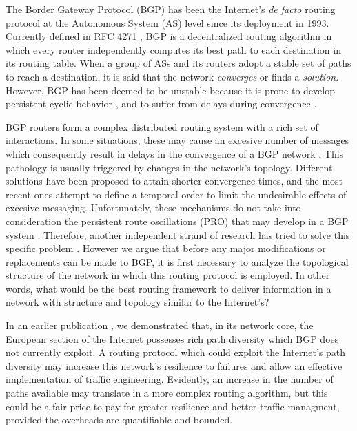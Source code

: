 \documentclass[5p,twocolumn]{elsarticle}
\begin{document}
The Border Gateway Protocol (BGP) has been the Internet's \emph{de facto} routing protocol at the Autonomous System (AS) level since its deployment in 1993. Currently defined in RFC 4271 \cite{Rekhter2006}, BGP is a decentralized routing algorithm in which every router independently computes its best path to each destination in its routing table. When a group of ASs and its routers adopt a stable set of paths to reach a destination, it is said that the network \emph{converges} or finds a \emph{solution}. However, BGP has been deemed to be unstable because it is prone to develop persistent cyclic behavior \cite{Varadhan1996}, and to suffer from delays during convergence \cite{Labovitz2000, Mao2002}.

BGP routers form a complex distributed routing system with a rich set of interactions. In some situations, these may cause an excesive number of messages which consequently result in delays in the convergence of a BGP network \cite{Labovitz1999, Labovitz2000, Mao2002}. This pathology is usually triggered by changes in the network's topology. Different solutions have been proposed to attain shorter convergence times, and the most recent ones \cite{Chandrashekar2005, Pei2005} attempt to define a temporal order to limit the undesirable effects of excesive messaging. Unfortunately, these mechanisms do not take into consideration the persistent route oscillations (PRO) that may develop in a BGP system \cite{Varadhan1996}. Therefore, another independent strand of research has tried to solve this specific problem \cite{Griffin1999, Griffin2002, Gao2000a, Cobb2004, Ee2007}. However we argue that before any major modifications or replacements can be made to BGP, it is first necessary to analyze the topological structure of the network in which this routing protocol is employed. In other words, what would be the best routing framework to deliver information in a network with structure and topology similar to the Internet's?

In an earlier publication \cite{Arjona-Villicana2010}, we demonstrated that, in its network core, the European section of the Internet possesses rich path diversity which BGP does not currently exploit. A routing protocol which could exploit the Internet's path diversity may increase this network's resilience to failures and allow an effective implementation of traffic engineering. Evidently, an increase in the number of paths available may translate in a more complex routing algorithm, but this could be a fair price to pay for greater resilience and better traffic managment, provided the overheads are quantifiable and bounded.
\end{document}

